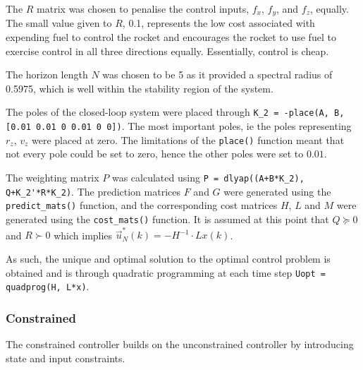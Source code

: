 \documentclass[conference, tikz]{IEEEtran}
\begin{document}
The $R$ matrix was chosen to penalise the control inputs, $f_x$, $f_y$, and $f_z$, equally.
The small value given to $R$, 0.1, represents the low cost associated with expending fuel to control the rocket and encourages the rocket to use fuel to exercise control in all three directions equally. Essentially, control is cheap. 

The horizon length $N$ was chosen to be 5 as it provided a spectral radius of 0.5975, which is well within the stability region of the system.

The poles of the closed-loop system were placed through \verb|K_2 = -place(A, B, [0.01 0.01 0 0.01 0 0])|. The most important poles, ie the poles representing $r_z$, $v_z$ were placed at zero. 
The limitations of the \verb|place()| function meant that not every pole could be set to zero, hence the other poles were set to $0.01$. 

The weighting matrix $P$ was calculated using \verb|P = dlyap((A+B*K_2), Q+K_2'*R*K_2)|. The prediction matrices $F$ and $G$ were generated using the \verb|predict_mats()| function, and the corresponding cost matrices $H$, $L$ and $M$ were generated using the \verb|cost_mats()| function. 
It is assumed at this point that $Q\succeq 0$ and $R \succ 0$ which implies $\vec u^*_N(k) = -H^{-1}\cdot Lx(k)$.

As such, the unique and optimal solution to the optimal control problem is obtained and is through quadratic programming at each time step \verb|Uopt = quadprog(H, L*x)|. 

\subsubsection{Constrained}
The constrained controller builds on the unconstrained controller by introducing state and input constraints. 
\end{document}
